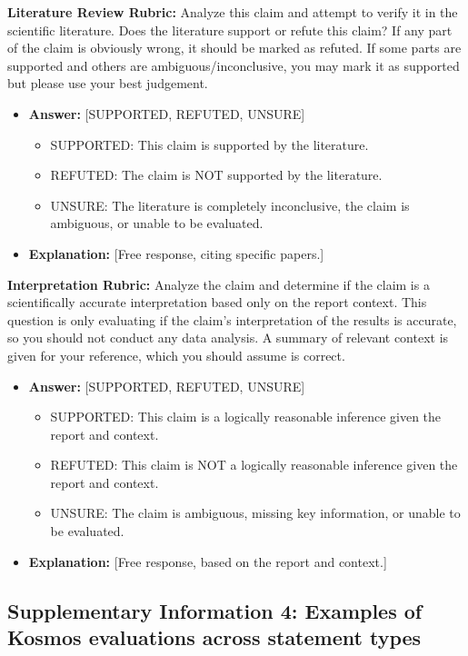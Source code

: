 \documentclass{article}
\begin{document}
\textbf{Literature Review Rubric:} Analyze this claim and attempt to verify it in the scientific literature. Does the literature support or refute this claim? If any part of the claim is obviously wrong, it should be marked as refuted. If some parts are supported and others are ambiguous/inconclusive, you may mark it as supported but please use your best judgement.
\begin{itemize}
    \item \textbf{Answer:} [SUPPORTED, REFUTED, UNSURE]
    \begin{itemize}
        \item SUPPORTED: This claim is supported by the literature.
        \item REFUTED: The claim is NOT supported by the literature.
        \item UNSURE: The literature is completely inconclusive, the claim is ambiguous, or unable to be evaluated.
    \end{itemize}
    \item \textbf{Explanation:} [Free response, citing specific papers.]
\end{itemize}

\textbf{Interpretation Rubric:} Analyze the claim and determine if the claim is a scientifically accurate interpretation based only on the report context. This question is only evaluating if the claim’s interpretation of the results is accurate, so you should not conduct any data analysis. A summary of relevant context is given for your reference, which you should assume is correct.
\begin{itemize}
    \item \textbf{Answer:} [SUPPORTED, REFUTED, UNSURE]
    \begin{itemize}
        \item SUPPORTED: This claim is a logically reasonable inference given the report and context.
        \item REFUTED: This claim is NOT a logically reasonable inference given the report and context.
        \item UNSURE: The claim is ambiguous, missing key information, or unable to be evaluated.
    \end{itemize}
    \item \textbf{Explanation:} [Free response, based on the report and context.]
\end{itemize}

\newpage
\subsection*{Supplementary Information 4: Examples of Kosmos evaluations across statement types}
\label{sec:supp_eval_answers}
\end{document}
